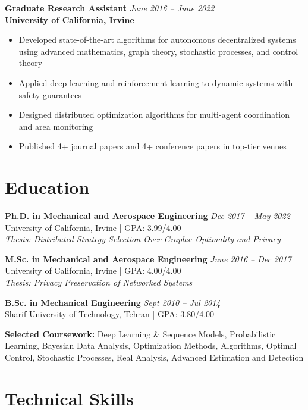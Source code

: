 \documentclass[11pt,letterpaper]{article}
\begin{document}
\textbf{Graduate Research Assistant} \hfill \textit{June 2016 -- June 2022}\\
\textbf{University of California, Irvine}
\begin{itemize}[leftmargin=*, itemsep=0pt, parsep=2pt]
    \item Developed state-of-the-art algorithms for autonomous decentralized systems using advanced mathematics, graph theory, stochastic processes, and control theory
    \item Applied deep learning and reinforcement learning to dynamic systems with safety guarantees
    \item Designed distributed optimization algorithms for multi-agent coordination and area monitoring
    \item Published 4+ journal papers and 4+ conference papers in top-tier venues
\end{itemize}

\section*{Education}

\textbf{Ph.D. in Mechanical and Aerospace Engineering} \hfill \textit{Dec 2017 -- May 2022}\\
University of California, Irvine | GPA: 3.99/4.00\\
\textit{Thesis: Distributed Strategy Selection Over Graphs: Optimality and Privacy}

\textbf{M.Sc. in Mechanical and Aerospace Engineering} \hfill \textit{June 2016 -- Dec 2017}\\
University of California, Irvine | GPA: 4.00/4.00\\
\textit{Thesis: Privacy Preservation of Networked Systems}

\textbf{B.Sc. in Mechanical Engineering} \hfill \textit{Sept 2010 -- Jul 2014}\\
Sharif University of Technology, Tehran | GPA: 3.80/4.00

\textbf{Selected Coursework:} Deep Learning \& Sequence Models, Probabilistic Learning, Bayesian Data Analysis, Optimization Methods, Algorithms, Optimal Control, Stochastic Processes, Real Analysis, Advanced Estimation and Detection

\section*{Technical Skills}
\end{document}
